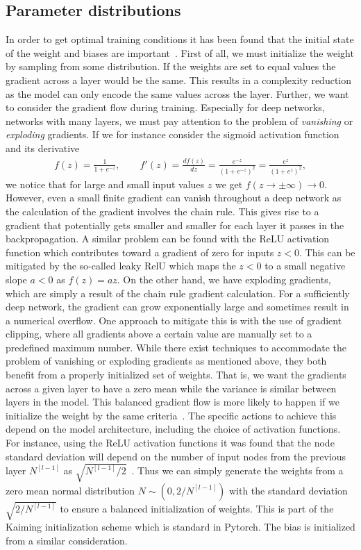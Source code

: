 \subsection{Parameter distributions}
In order to get optimal training conditions it has been found that the initial
state of the weight and biases are important~\cite{salimans2016weight}. First of all, we must initialize the weight by sampling from some distribution. If the weights are set
to equal values the gradient across a layer would be the same. This results in a
complexity reduction as the model can only encode the same values across the
layer. Further, we want to consider the gradient flow during training. Especially for deep networks, networks with many layers, we must pay attention to the problem of \textit{vanishing} or \textit{exploding} gradients. If we for instance consider the sigmoid activation function and its derivative 
\begin{align*}
  f(z) = \frac{1}{1 + e^{-z}}, \qquad f'(z) = \frac{df(z)}{dz} = \frac{e^{-z}}{(1+e^{-z})^2} = \frac{e^{z}}{(1+e^{z})^2},
\end{align*}
we notice that for large and small input values $z$ we get $f(z\to \pm\infty)
\to 0$. However, even a small finite gradient can vanish throughout a deep
network as the calculation of the gradient involves the chain rule. This gives
rise to a gradient that potentially gets smaller and smaller for each layer it
passes in the backpropagation. A similar problem can be found with the ReLU
activation function which contributes toward a gradient of zero for inputs
$z<0$. This can be mitigated by the so-called leaky RelU which maps the $z<0$ to
a small negative slope $a<0$ as $f(z) = az$. On the other hand, we have
exploding gradients, which are simply a result of the chain rule gradient
calculation. For a sufficiently deep network, the gradient can grow
exponentially large and sometimes result in a numerical overflow. One approach
to mitigate this is with the use of gradient clipping, where all gradients above
a certain value are manually set to a predefined maximum number. While there
exist techniques to accommodate the problem of vanishing or exploding gradients
as mentioned above, they both benefit from a properly initialized set of
weights. That is, we want the gradients across a given layer to have a zero mean
while the variance is similar between layers in the model. This balanced
gradient flow is more likely to happen if we initialize the weight by the same
criteria~\cite{salimans2016weight}. The specific actions to achieve this depend
on the model architecture, including the choice of activation functions. For
instance, using the ReLU activation functions it was found that the node
standard deviation will depend on the number of input nodes from the previous
layer $N^{[l-1]}$ as $\sqrt{N^{[l-1]}/2}$~\cite{he2015delving}. Thus we can
simply generate the weights from a zero mean normal distribution $N \sim (0,
2/N^{[l-1]})$ with the standard deviation $\sqrt{2/N^{[l-1]}}$ to ensure a balanced initialization of weights. This is part of the Kaiming initialization scheme which is standard in Pytorch.
The bias is initialized from a similar consideration.

